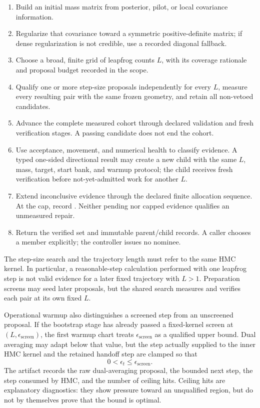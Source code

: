 \begin{enumerate}
  \item Build an initial mass matrix from posterior, pilot, or local covariance
    information.
  \item Regularize that covariance toward a symmetric positive-definite matrix;
    if dense regularization is not credible, use a recorded diagonal fallback.
  \item Choose a broad, finite grid of leapfrog counts \(L\), with its
    coverage rationale and proposal budget recorded in the scope.
  \item Qualify one or more step-size proposals independently for every \(L\),
    measure every resulting pair with the same frozen geometry, and retain all
    non-vetoed candidates.
  \item Advance the complete measured cohort through declared validation and
    fresh verification stages.  A passing candidate does not end the cohort.
  \item Use acceptance, movement, and numerical health to classify evidence. A typed
    one-sided directional result may create a new child with the same \(L\),
    mass, target, start bank, and warmup protocol; the child receives fresh
    verification before not-yet-admitted work for another \(L\).
  \item Extend inconclusive evidence through the declared finite allocation
    sequence. At the cap, record . Neither pending
    nor capped evidence qualifies an unmeasured repair.
  \item Return the verified set and immutable parent/child records.  A
    caller chooses a member explicitly; the controller issues no nominee.
\end{enumerate}

The step-size search and the trajectory length must refer to the same HMC
kernel.  In particular, a reasonable-step calculation performed with one
leapfrog step is not valid evidence for a later fixed trajectory with
\(L>1\). Preparation screens may seed later proposals, but the shared search
measures and verifies each pair at its own fixed \(L\).

Operational warmup also distinguishes a screened step from an unscreened
proposal.  If the bootstrap stage has already passed a fixed-kernel screen at
\((L,\epsilon_{\mathrm{screen}})\), the first warmup chart treats
\(\epsilon_{\mathrm{screen}}\) as a qualified upper bound.  Dual averaging may
adapt below that value, but the step actually supplied to the inner HMC kernel
and the retained handoff step are clamped so that
\[
  0 < \epsilon_t \leq \epsilon_{\mathrm{screen}}.
\]
The artifact records the raw dual-averaging proposal, the bounded next step,
the step consumed by HMC, and the number of ceiling hits.  Ceiling hits are
explanatory diagnostics: they show pressure toward an unqualified region, but
do not by themselves prove that the bound is optimal.

